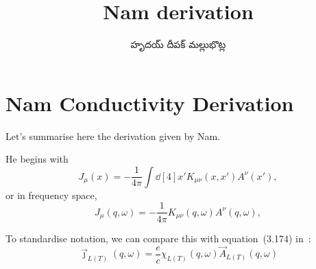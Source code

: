 \documentclass[../main.tex]{subfiles}
\title{Nam derivation}
\author{\begin{telugu}హృదయ్ దీపక్ మల్లుభొట్ల\end{telugu}}
\date{}
\begin{document}
	\onlyinsubfile{\maketitle}
	\section{Nam Conductivity Derivation} \label{sec:Nam}
	Let's summarise here the derivation given by Nam\supercite{Nam1967}.

	He begins with
	\begin{equation}
		J_\mu(x) = - \frac{1}{4\pi}\int \dd[4]{x'} K_{\mu\nu}(x, x') A^\nu(x'),
	\end{equation}
	or in frequency space,
	\begin{equation}
		J_\mu(q, \omega) = - \frac{1}{4\pi} K_{\mu\nu}(q, \omega) A^\nu(q, \omega),
	\end{equation}

	To standardise notation, we can compare this with equation~(3.174) in~\cite{Giuliani2005}:
	\begin{equation}
		\vec{\jmath}_{L(T)}(q, \omega) = \frac{e}{c} \chi_{L(T)}(q, \omega) \vec{A}_{L(T)}(q, \omega)
	\end{equation}
\end{document}
